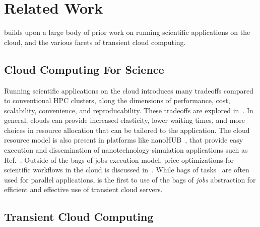 \vspace*{\subsecspace}
\section{Related Work}
\label{sec:related}
\sysname builds upon a large body of prior work on running scientific applications on the cloud, and the various facets of transient cloud computing.  

\vspace*{\subsecspace}
\subsection{Cloud Computing For Science}
Running scientific applications on the cloud introduces many tradeoffs compared to conventional HPC clusters, along the dimensions of performance, cost, scalability, convenience, and reproducability.
These tradeoffs are explored in~\cite{iosup_performance_2011, zhai_cloud_2011, marathe2013comparative, galante_analysis_2016, benedictis_cloud-aware_2014}.
In general, clouds can provide increased elasticity, lower waiting times, and more choices in resource allocation that can be tailored to the application.
The cloud resource model is also present in platforms like nanoHUB~\cite{nanohub}, that provide easy execution and dissemination of nanotechnology simulation applications such as Ref.~\cite{kadupitiya2017}.
Outside of the bags of jobs execution model, price optimizations for scientific workflows in the cloud is discussed in~\cite{gari_learning_2019}. 
While bags of tasks~\cite{varshney_autobot_2019} are often used for parallel applications, \sysname is the first to use of the bags of \emph{jobs} abstraction for efficient and effective use of transient cloud servers. 

\vspace*{\subsecspace}
\subsection{Transient Cloud Computing}

